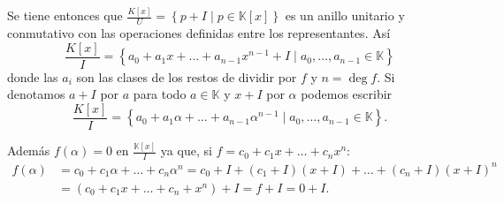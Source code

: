 \documentclass[10pt, spanish]{report}
\theoremstyle{definition}
\newcommand{\K}{\mathbb{K}}
\begin{document}
Se tiene entonces que $\frac{K[x]}{U}=\left\{ p+I\mid p\in\K[x] \right\}$ es un
anillo unitario y conmutativo con las operaciones definidas entre los
representantes. Así
\[\frac{K[x]}{I}=\left\{ a_0+a_1x+\ldots+a_{n-1}x^{n-1}+I\mid a_0,\ldots,a_{n-1}
\in\K \right\}\]
donde las $a_i$ son las clases de los restos de dividir por $f$ y $n=\deg{f}$.
Si denotamos $a+I$ por $a$ para todo $a\in\K$ y $x+I$ por $\alpha$ podemos
escribir
\[\frac{K[x]}{I}=\left\{ a_0+a_1\alpha+\ldots+a_{n-1}\alpha^{n-1}\mid a_0,\ldots,a_{n-1}
\in\K \right\}.\]


Además $f(\alpha)=0$ en $\frac{\K[x]}{I}$ ya que, si $f=c_0+c_1x+\ldots+c_nx^n$:
\begin{equation*}
    \begin{split}
        f(\alpha) &=c_0+c_1\alpha+\ldots+c_n\alpha^n
              =c_0+I+(c_1+I)(x+I)+\ldots+(c_n+I)(x+I)^n \\
                  &=(c_0+c_1x+\ldots+c_n+x^n)+I=f+I=0+I.
    \end{split}
\end{equation*}
\end{document}
